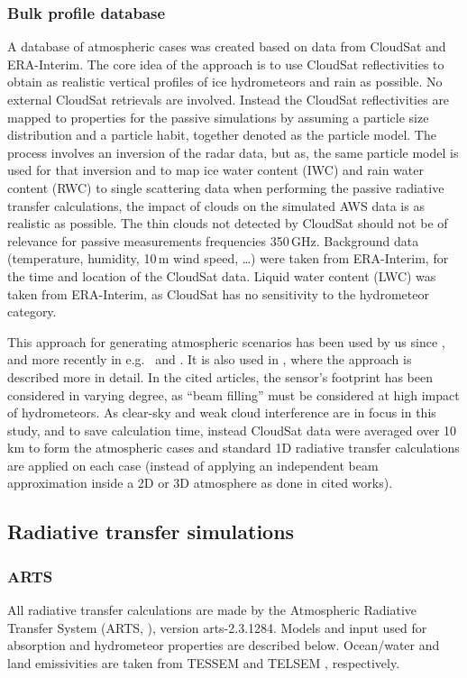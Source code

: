 \documentclass[12pt]{article}
\begin{document}
\subsubsection{Bulk profile database}
%
A database of atmospheric cases was created based on data from CloudSat and
ERA-Interim. The core idea of the approach is to use CloudSat reflectivities to
obtain as realistic vertical profiles of ice hydrometeors and rain as
possible. No external CloudSat retrievals are involved. Instead the CloudSat
reflectivities are mapped to properties for the passive simulations by assuming
a particle size distribution and a particle habit, together denoted as
the particle model. The process involves an inversion of the radar data, but as,
the same particle model is used for that inversion and to map ice water content
(IWC) and rain water content (RWC) to single scattering data when performing
the passive radiative transfer calculations, the impact of clouds on the
simulated AWS data is as realistic as possible. The thin clouds not detected by
CloudSat should not be of relevance for passive measurements frequencies
350\,GHz. Background data (temperature, humidity, 10\,m wind speed, \dots) were
taken from ERA-Interim, for the time and location of the CloudSat data. Liquid
water content (LWC) was taken from ERA-Interim, as CloudSat has no sensitivity
to the hydrometeor category.

This approach for generating atmospheric scenarios has been used by us since
\citet{rydberg:nonga:09}, and more recently in e.g.\
\citet{eriksson:towar:20} and \citet{barlakas:three:20}. It is also used in
\citet{ekelund:using:20}, where the approach is described more in detail. In
the cited articles, the sensor's footprint has been considered in varying
degree, as ``beam filling'' must be considered at high impact of hydrometeors.
As clear-sky and weak cloud interference are in focus in this study, and to
save calculation time, instead CloudSat data were averaged over 10\,km to form
the atmospheric cases and standard 1D radiative transfer calculations are
applied on each case (instead of applying an independent beam approximation
inside a 2D or 3D atmosphere as done in cited works).



\subsection{Radiative transfer simulations}
%
\subsubsection{ARTS}
%
All radiative transfer calculations are made by the Atmospheric Radiative
Transfer System (ARTS, \citet{eriksson:arts2:11,buehler:artst:18}), version
arts-2.3.1284. Models and input used for absorption and hydrometeor properties
are described below. Ocean/water and land emissivities are taken from
TESSEM \citep{prigent2017sea} and TELSEM \citep{aires2011tool}, respectively.
\end{document}
